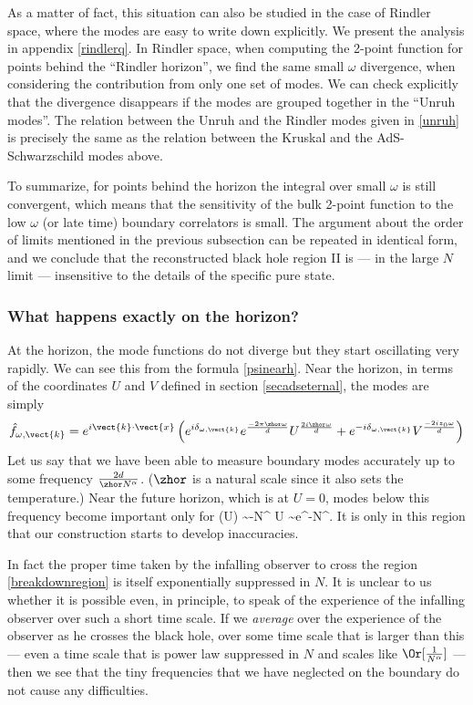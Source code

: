 As a matter of fact, this situation can also be studied in the case of Rindler space, where the modes are easy to write down explicitly. We present the analysis in appendix \ref{rindlerq}. In Rindler space, when computing the 2-point function for points behind the ``Rindler horizon'', we find the same small $\omega$ divergence, when considering the contribution from only one set of modes. 
We can check explicitly that the divergence disappears if the modes are grouped together in the ``Unruh modes''. The relation between the Unruh and the Rindler modes given in \eqref{unruh} is precisely the same as the relation between the Kruskal and the AdS-Schwarzschild modes above.


To summarize, for points behind the horizon the integral over small $\omega$ is still convergent, which means that the sensitivity of the bulk 2-point function to the low $\omega$ (or late time) boundary correlators is small. The argument about the order of limits mentioned in the previous subsection can be repeated
in identical form, and we conclude that the reconstructed black hole region II is --- in the large $N$ limit --- insensitive to the details of the specific pure state.


\subsubsection{What happens exactly on the horizon?}
At the horizon, the mode functions do not diverge but they start oscillating very rapidly. We can see this from the formula \eqref{psinearh}. Near the horizon, in terms of the coordinates $U$ and $V$ defined in section \ref{secadseternal}, the modes are simply
\[
\hat{f}_{\omega, \vect{k}} = e^{i \vect{k} \cdot \vect{x}} \left(e^{i \delta_{\omega, \vect{k}}} e^{-2 \pi \zhor \omega \over d} U^{2 i \zhor \omega \over d} + e^{-i \delta_{\omega, \vect{k}}} V^{-2 i z_0 \omega \over d} \right)
\]
Let us say that we have been able to measure boundary modes accurately up to some frequency ${2 d \over \zhor N^{\alpha}}$. ($\zhor$ is a natural scale since it also sets the temperature.)  Near the future horizon, which is at $U = 0$, modes below
this frequency become important only for 
\be
\label{breakdownregion}
\ln(U) \sim -N^{\alpha} \Rightarrow U \sim e^{-N^{\alpha}}.
\ee
It is only in this region that our construction starts to develop inaccuracies.

In fact the proper time taken by the infalling observer to cross the region \eqref{breakdownregion} is itself exponentially suppressed in $N$. It is unclear to us whether it is possible even, in principle, to speak of the experience of the infalling observer over such a short time scale. If we {\em average} over the experience of the observer as he crosses the black hole, over some time scale that is larger than this --- even a time scale that is power law suppressed in $N$ and scales like $\Or[{1 \over N^{\alpha}}]$ --- then we see that the tiny frequencies that we have neglected on the boundary do not cause any difficulties. 




